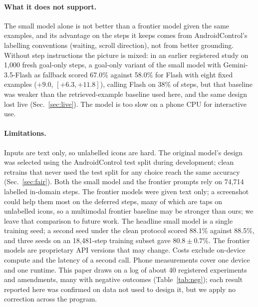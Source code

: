 \documentclass[10pt]{article}
\begin{document}
\paragraph{What it does not support.} The small model alone is not better than a frontier model given the same examples, and its advantage on the steps it keeps comes from AndroidControl's labelling conventions (waiting, scroll direction), not from better grounding. Without step instructions the picture is mixed: in an earlier registered study on 1{,}000 fresh goal-only steps, a goal-only variant of the small model with Gemini-3.5-Flash as fallback scored 67.0\% against 58.0\% for Flash with eight fixed examples ($+9.0$, $[+6.3, +11.8]$), calling Flash on 38\% of steps, but that baseline was weaker than the retrieved-example baseline used here, and the same design lost live (Sec.~\ref{sec:live}). The model is too slow on a phone CPU for interactive use.

\paragraph{Limitations.} Inputs are text only, so unlabelled icons are hard. The original model's design was selected using the AndroidControl test split during development; clean retrains that never used the test split for any choice reach the same accuracy (Sec.~\ref{sec:fair}). Both the small model and the frontier prompts rely on 74{,}714 labelled in-domain steps. The frontier models were given text only; a screenshot could help them most on the deferred steps, many of which are taps on unlabelled icons, so a multimodal frontier baseline may be stronger than ours; we leave that comparison to future work. The headline small model is a single training seed; a second seed under the clean protocol scored 88.1\% against 88.5\%, and three seeds on an 18{,}481-step training subset gave $80.8\pm0.7$\%. The frontier models are proprietary API versions that may change. Costs exclude on-device compute and the latency of a second call. Phone measurements cover one device and one runtime. This paper draws on a log of about 40 registered experiments and amendments, many with negative outcomes (Table~\ref{tab:neg}); each result reported here was confirmed on data not used to design it, but we apply no correction across the program.
\end{document}
